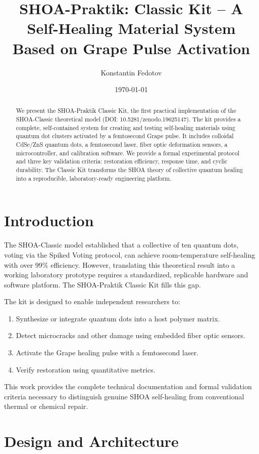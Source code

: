 \documentclass[12pt]{article}
\title{SHOA-Praktik: Classic Kit -- A Self-Healing Material System Based on Grape Pulse Activation}
\author{Konstantin Fedotov}
\date{\today}
\begin{document}
\maketitle

\begin{abstract}
We present the SHOA-Praktik Classic Kit, the first practical implementation of the SHOA-Classic theoretical model (DOI: 10.5281/zenodo.19625147). The kit provides a complete, self-contained system for creating and testing self-healing materials using quantum dot clusters activated by a femtosecond Grape pulse. It includes colloidal CdSe/ZnS quantum dots, a femtosecond laser, fiber optic deformation sensors, a microcontroller, and calibration software. We provide a formal experimental protocol and three key validation criteria: restoration efficiency, response time, and cyclic durability. The Classic Kit transforms the SHOA theory of collective quantum healing into a reproducible, laboratory-ready engineering platform.
\end{abstract}

\section{Introduction}
The SHOA-Classic model established that a collective of ten quantum dots, voting via the Spiked Voting protocol, can achieve room-temperature self-healing with over 99\% efficiency. However, translating this theoretical result into a working laboratory prototype requires a standardized, replicable hardware and software platform. The SHOA-Praktik Classic Kit fills this gap.

The kit is designed to enable independent researchers to:
\begin{enumerate}
    \item Synthesize or integrate quantum dots into a host polymer matrix.
    \item Detect microcracks and other damage using embedded fiber optic sensors.
    \item Activate the Grape healing pulse with a femtosecond laser.
    \item Verify restoration using quantitative metrics.
\end{enumerate}

This work provides the complete technical documentation and formal validation criteria necessary to distinguish genuine SHOA self-healing from conventional thermal or chemical repair.

\section{Design and Architecture}
\end{document}
